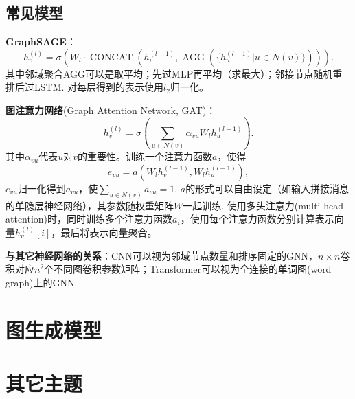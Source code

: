 \subsection{常见模型}
\par \textbf{GraphSAGE}：
\begin{equation}
    h_v^{(l)}=\sigma(W_l \cdot \operatorname{CONCAT}(h_v^{(l-1)},\operatorname{AGG}(\{h_u^{(l-1)}\vert u\in N(v)\}))).
\end{equation}
其中邻域聚合AGG可以是取平均；先过MLP再平均（求最大）；邻接节点随机重排后过LSTM. 对每层得到的表示使用$l_2$归一化。
\par \textbf{图注意力网络}(Graph Attention Network, GAT)：
\begin{equation}
    h_v^{(l)}=\sigma(\sum_{u\in N(v)}\alpha_{vu}W_l h_u^{(l-1)} ).
\end{equation}
其中$\alpha_{vu}$代表$u$对$v$的重要性。训练一个注意力函数$a$，使得
\begin{equation}
    e_{vu}=a(W_l h_v^{(l-1)},W_l h_u^{(l-1)}),
\end{equation}
$e_{vu}$归一化得到$a_{vu}$，使$\sum_{u\in N(v)}a_{vu}=1$. $a$的形式可以自由设定（如输入拼接消息的单隐层神经网络），其参数随权重矩阵$W$一起训练. 使用多头注意力(multi-head attention)时，同时训练多个注意力函数$a_i$，使用每个注意力函数分别计算表示向量$h_v^{(l)}[i]$，最后将表示向量聚合。

\par \textbf{与其它神经网络的关系}：CNN可以视为邻域节点数量和排序固定的GNN，$n\times n$卷积对应$n^2$个不同图卷积参数矩阵；Transformer可以视为全连接的单词图(word graph)上的GNN.


\section{图生成模型}


\section{其它主题}
